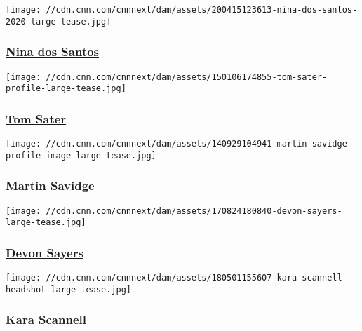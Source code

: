 \href{/profiles/nina-dos-santos}{}

\texttt{[image: //cdn.cnn.com/cnnnext/dam/assets/200415123613-nina-dos-santos-2020-large-tease.jpg]}

\hypertarget{nina-dos-santos}{%
\subsubsection{\texorpdfstring{\href{/profiles/nina-dos-santos}{Nina dos
Santos}}{Nina dos Santos}}\label{nina-dos-santos}}

\href{/profiles/tom-sater}{}

\texttt{[image: //cdn.cnn.com/cnnnext/dam/assets/150106174855-tom-sater-profile-large-tease.jpg]}

\hypertarget{tom-sater}{%
\subsubsection{\texorpdfstring{\href{/profiles/tom-sater}{Tom
Sater}}{Tom Sater}}\label{tom-sater}}

\href{/profiles/martin-savidge-profile}{}

\texttt{[image: //cdn.cnn.com/cnnnext/dam/assets/140929104941-martin-savidge-profile-image-large-tease.jpg]}

\hypertarget{martin-savidge}{%
\subsubsection{\texorpdfstring{\href{/profiles/martin-savidge-profile}{Martin
Savidge}}{Martin Savidge}}\label{martin-savidge}}

\href{/profiles/devon-sayers}{}

\texttt{[image: //cdn.cnn.com/cnnnext/dam/assets/170824180840-devon-sayers-large-tease.jpg]}

\hypertarget{devon-sayers}{%
\subsubsection{\texorpdfstring{\href{/profiles/devon-sayers}{Devon
Sayers}}{Devon Sayers}}\label{devon-sayers}}

\href{/profiles/kara-scannell-profile}{}

\texttt{[image: //cdn.cnn.com/cnnnext/dam/assets/180501155607-kara-scannell-headshot-large-tease.jpg]}

\hypertarget{kara-scannell}{%
\subsubsection{\texorpdfstring{\href{/profiles/kara-scannell-profile}{Kara
Scannell}}{Kara Scannell}}\label{kara-scannell}}

